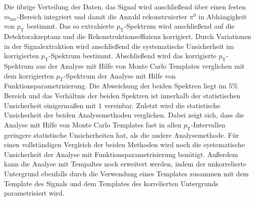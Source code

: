 Die übrige Verteilung der Daten, das Signal wird anschließend über einen festen $m_\text{inv}$-Bereich integriert und damit die Anzahl rekonstruierter $\pi^{0}$ in Abhängigkeit von $p_\text{T}$ bestimmt.
\newline
Das so extrahierte $p_\text{T}$-Spektrum wird anschließend auf die Detektorakzeptanz und die Rekonstruktionseffizienz korrigiert.
Durch Variationen in der Signalextraktion wird anschließend die systematische Unsicherheit im korrigierten $p_\text{T}$-Spektrum bestimmt.
\newline
Abschließend wird das korrigierte $p_\text{T}$-Spektrum aus der Analyse mit Hilfe von Monte Carlo Templates verglichen mit dem korrigierten $p_\text{T}$-Spektrum der Analyse mit Hilfe von Funktionsparametrisierung.
Die Abweichung der beiden Spektren liegt im $5\%$ Bereich und das Verhältnis der beiden Spektren ist innerhalb der statistischen Unsicherheit einigermaßen mit $1$ vereinbar.
Zuletzt wird die statistische Unsicherheit der beiden Analysemethoden verglichen.
Dabei zeigt sich, dass die Analyse mit Hilfe von Monte Carlo Templates fast in allen $p_\text{T}$-Intervallen geringere statistische Unsicherheiten hat, als die andere Analysemethode.
\newline
Für einen vollständigen Vergleich der beiden Methoden wird noch die systematische Unsicherheit der Analyse mit Funktionsparametrisierung benötigt.
Außerdem kann die Analyse mit Tempaltes noch erweitert werden, indem der unkorrelierte Untergrund ebenfalls durch die Verwendung eines Templates zusammen mit dem Template des Signals und dem Templates des korrelierten Untergrunds parametrisiert wird.